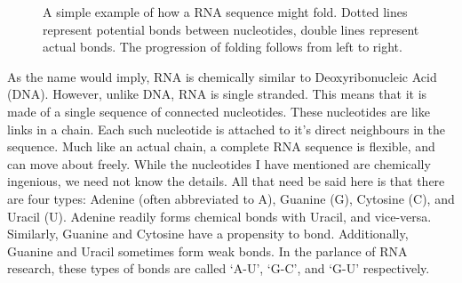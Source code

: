 \documentclass[12pt, a4paper]{article}
\begin{document}
\begin{figure}
\begin{center}
\end{center}
\caption{A simple example of how a RNA sequence might fold. Dotted lines represent potential bonds between nucleotides, double lines represent actual bonds. The progression of folding follows from left to right.}
\label{fig:RNAssBasic}
\end{figure}


As the name would imply, RNA is chemically similar to Deoxyribonucleic Acid (DNA). However, unlike DNA, RNA is single stranded. This means that it is made of a single sequence of connected nucleotides. These nucleotides are like links in a chain. Each such nucleotide is attached to it's direct neighbours in the sequence. Much like an actual chain, a complete RNA sequence is flexible, and can move about freely. While the nucleotides I have mentioned are chemically ingenious, we need not know the details. All that need be said here is that there are four types: Adenine (often abbreviated to A), Guanine (G), Cytosine (C), and Uracil (U). Adenine readily forms chemical bonds with Uracil, and vice-versa. Similarly, Guanine and Cytosine have a propensity to bond. Additionally, Guanine and Uracil sometimes form weak bonds. In the parlance of RNA research, these types of bonds are called `A-U', `G-C', and `G-U' respectively.
\end{document}
